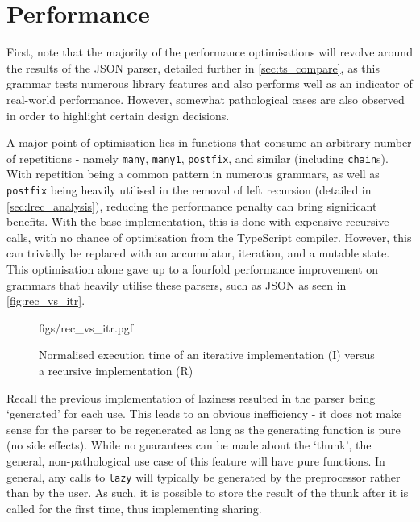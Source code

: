 
\section{Performance}
\label{sec:perf}

First, note that the majority of the performance optimisations will revolve around the results of the JSON parser, detailed further in \autoref{sec:ts_compare}, as this grammar tests numerous library features and also performs well as an indicator of real-world performance.
However, somewhat pathological cases are also observed in order to highlight certain design decisions.

A major point of optimisation lies in functions that consume an arbitrary number of repetitions - namely \texttt{many}, \texttt{many1}, \texttt{postfix}, and similar (including \texttt{chain}s).
With repetition being a common pattern in numerous grammars, as well as \texttt{postfix} being heavily utilised in the removal of left recursion (detailed in \autoref{sec:lrec_analysis}), reducing the performance penalty can bring significant benefits.
With the base implementation, this is done with expensive recursive calls, with no chance of optimisation from the TypeScript compiler.
However, this can trivially be replaced with an accumulator, iteration, and a mutable state.
This optimisation alone gave up to a fourfold performance improvement on grammars that heavily utilise these parsers, such as JSON as seen in \autoref{fig:rec_vs_itr}.

\begin{figure}[H]
    \centering
    {figs/rec_vs_itr.pgf}
    \vspace{-0.5\baselineskip}
    \caption{Normalised execution time of an iterative implementation (I) versus a recursive implementation (R)}
    \label{fig:rec_vs_itr}
\end{figure}

Recall the previous implementation of laziness resulted in the parser being `generated' for each use.
This leads to an obvious inefficiency - it does not make sense for the parser to be regenerated as long as the generating function is pure (no side effects).
While no guarantees can be made about the `thunk', the general, non-pathological use case of this feature will have pure functions.
In general, any calls to \texttt{lazy} will typically be generated by the preprocessor rather than by the user.
As such, it is possible to store the result of the thunk after it is called for the first time, thus implementing sharing.

